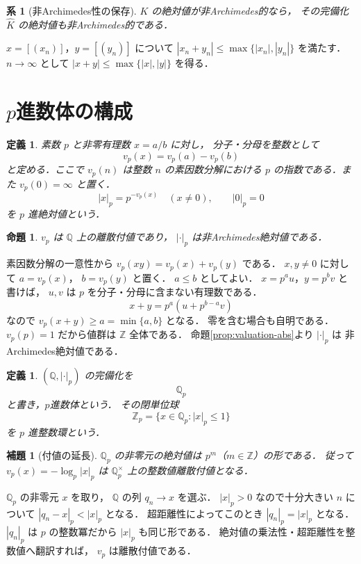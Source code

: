 \documentclass[a5paper,10pt,onecolumn]{jsarticle}
\makeatletter
\theoremstyle{mathnotetheorem}
\newtheorem{definition}[theorem]{定義}
\newtheorem{lemma}[theorem]{補題}
\newtheorem{proposition}[theorem]{命題}
\newtheorem{corollary}[theorem]{系}
\renewcommand{\proofname}{証明}
\renewenvironment{proof}[1][\proofname]{%
  \par\pushQED{\qed}\normalfont\topsep4\p@\@plus2\p@\relax
  \trivlist\item[\hskip\labelsep\bfseries #1]\ignorespaces
}{\popQED\endtrivlist\@endpefalse}
\makeatother
\begin{document}
\begin{corollary}[非Archimedes性の保存]\label{cor:completion-nonarch}
$K$ の絶対値が非Archimedes的なら，
その完備化 $\widehat K$ の絶対値も非Archimedes的である．
\end{corollary}
\begin{proof}
$x=[(x_n)]$，$y=[(y_n)]$ について
$|x_n+y_n|\le\max\{|x_n|,|y_n|\}$ を満たす．
$n\to\infty$ として
$|x+y|\le\max\{|x|,|y|\}$ を得る．
\end{proof}

\section{$p$進数体の構成}

\begin{definition}
素数 $p$ と非零有理数 $x=a/b$ に対し，
分子・分母を整数として
\[
 v_p(x)=v_p(a)-v_p(b)
\]
と定める．ここで $v_p(n)$ は整数 $n$ の素因数分解における
$p$ の指数である．また $v_p(0)=\infty$ と置く．
\[
 |x|_p=p^{-v_p(x)}\quad(x\ne0),\qquad |0|_p=0
\]
を $p$ 進絶対値という．
\end{definition}

\begin{proposition}\label{prop:p-adic-absolute}
$v_p$ は $\mathbb Q$ 上の離散付値であり，
$|\cdot|_p$ は非Archimedes絶対値である．
\end{proposition}
\begin{proof}
素因数分解の一意性から
$v_p(xy)=v_p(x)+v_p(y)$ である．
$x,y\ne0$ に対して $a=v_p(x)$，
$b=v_p(y)$ と置く．
$a\le b$ としてよい．
$x=p^au$，$y=p^bv$ と書けば，
$u,v$ は $p$ を分子・分母に含まない有理数である．
\[
 x+y=p^a(u+p^{b-a}v)
\]
なので $v_p(x+y)\ge a=\min\{a,b\}$ となる．
零を含む場合も自明である．
$v_p(p)=1$ だから値群は $\mathbb Z$ 全体である．
命題\ref{prop:valuation-abs}より $|\cdot|_p$ は
非Archimedes絶対値である．
\end{proof}

\begin{definition}
$(\mathbb Q,|\cdot|_p)$ の完備化を
\[
 \mathbb Q_p
\]
と書き，\emph{$p$進数体}という．
その閉単位球
\[
 \mathbb Z_p=\{x\in\mathbb Q_p:|x|_p\le1\}
\]
を $p$ 進整数環という．
\end{definition}

\begin{lemma}[付値の延長]\label{lem:valuation-extend}
$\mathbb Q_p$ の非零元の絶対値は
$p^m$（$m\in\mathbb Z$）の形である．
従って $v_p(x)=-\log_p|x|_p$ は
$\mathbb Q_p^\times$ 上の整数値離散付値となる．
\end{lemma}
\begin{proof}
$\mathbb Q_p$ の非零元 $x$ を取り，
$\mathbb Q$ の列 $q_n\to x$ を選ぶ．
$|x|_p>0$ なので十分大きい $n$ について
$|q_n-x|_p<|x|_p$ となる．
超距離性によってこのとき
$|q_n|_p=|x|_p$ となる．
$|q_n|_p$ は $p$ の整数冪だから
$|x|_p$ も同じ形である．
絶対値の乗法性・超距離性を整数値へ翻訳すれば，
$v_p$ は離散付値である．
\end{proof}
\end{document}

